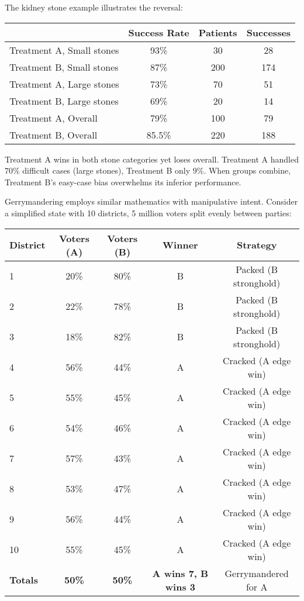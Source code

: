 The kidney stone example illustrates the reversal:

\begin{center}
\begin{tabular}{lccc}
\toprule
 & Success Rate & Patients & Successes \\
\midrule
Treatment A, Small stones & 93\% & 30 & 28 \\
Treatment B, Small stones & 87\% & 200 & 174 \\
Treatment A, Large stones & 73\% & 70 & 51 \\
Treatment B, Large stones & 69\% & 20 & 14 \\
\midrule
Treatment A, Overall & 79\% & 100 & 79 \\
Treatment B, Overall & 85.5\% & 220 & 188 \\
\bottomrule
\end{tabular}
\end{center}

Treatment A wins in both stone categories yet loses overall. Treatment A handled 70\% difficult cases (large stones), Treatment B only 9\%. When groups combine, Treatment B's easy-case bias overwhelms its inferior performance.

Gerrymandering employs similar mathematics with manipulative intent. Consider a simplified state with 10 districts, 5 million voters split evenly between parties:

\begin{center}
\begin{tabular}{lcccc}
\toprule
\textbf{District} & \textbf{Voters (A)} & \textbf{Voters (B)} & \textbf{Winner} & \textbf{Strategy} \\
\midrule
1 & 20\% & 80\% & B & Packed (B stronghold) \\
2 & 22\% & 78\% & B & Packed (B stronghold) \\
3 & 18\% & 82\% & B & Packed (B stronghold) \\
4 & 56\% & 44\% & A & Cracked (A edge win) \\
5 & 55\% & 45\% & A & Cracked (A edge win) \\
6 & 54\% & 46\% & A & Cracked (A edge win) \\
7 & 57\% & 43\% & A & Cracked (A edge win) \\
8 & 53\% & 47\% & A & Cracked (A edge win) \\
9 & 56\% & 44\% & A & Cracked (A edge win) \\
10 & 55\% & 45\% & A & Cracked (A edge win) \\
\midrule
\textbf{Totals} & \textbf{50\%} & \textbf{50\%} & \textbf{A wins 7, B wins 3} & Gerrymandered for A \\
\bottomrule
\end{tabular}
\end{center}

